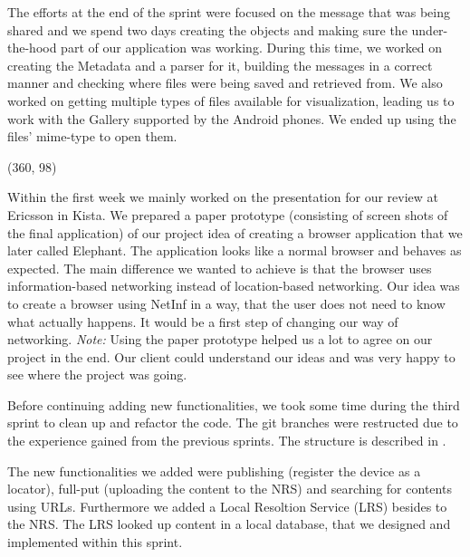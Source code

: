 The efforts at the end of the sprint were focused on the message that was being shared
and we spend two days creating the objects and making sure the under-the-hood part of
our application was working. During this time, we worked on creating the Metadata and a
parser for it, building the messages in a correct manner and checking where files were
being saved and retrieved from. We also worked on getting multiple types of files available
for visualization, leading us to work with the Gallery supported by the Android phones.
We ended up using the files' mime-type to open them.

\framebox(360, 98){
}

Within the first week we mainly worked on the presentation for our review at Ericsson in Kista.
We prepared a paper prototype (consisting of screen shots of the final application) of our 
project idea of creating a browser application that we later called
Elephant.
The application looks like a normal browser and behaves as expected. The main difference
we wanted to achieve is that the browser uses information-based networking instead of location-based
networking. Our idea was to create a browser using NetInf in a way, that the user does not
need to know what actually happens. It would be a first step of changing our way of 
networking. \textit{Note:} Using the paper prototype helped us a lot to agree on our
project in the end. Our client could understand our ideas and was very happy to
see where the project was going.

Before continuing adding new functionalities, we took some time during the third sprint
to clean up and refactor the code. The git branches were restructed due to the
experience gained from the previous sprints. The structure is described in .

The new functionalities we added were publishing (register the 
device as a locator), full-put (uploading the content to the NRS) and
searching for contents using URLs. Furthermore we added a Local Resoltion Service (LRS)
besides to the NRS. The LRS looked up content in a local database, that we
designed and implemented within this sprint. 

